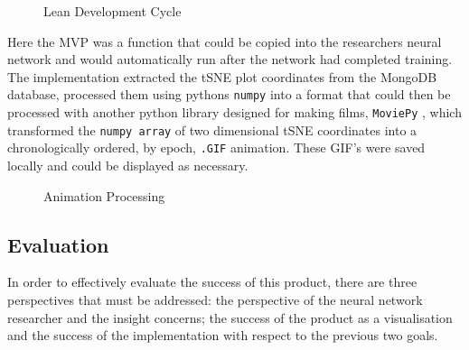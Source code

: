 \documentclass[a4paper,11pt,titlepage]{article}
\begin{document}
	\begin{figure}[H]
    			\caption{Lean Development Cycle}%
	\end{figure}	
	
	Here the MVP was a function that could be copied into the researchers neural network and would automatically run after the network had completed training. The implementation extracted the tSNE plot coordinates from the MongoDB database, processed them using pythons \texttt{numpy} into a format that could then be processed with another python library designed for making films, \texttt{MoviePy} \cite{}, which transformed the \texttt{numpy array} of two dimensional tSNE coordinates into a chronologically ordered, by epoch, \texttt{.GIF} animation. These GIF's were saved locally and could be displayed as necessary.
	
	\begin{figure}[H]
    			\caption{Animation Processing}%
	\end{figure}		

	
	\subsection{Evaluation}
	In order to effectively evaluate the success of this product, there are three perspectives that must be addressed: the perspective of the neural network researcher and the insight concerns; the success of the product as a visualisation and the success of the implementation with respect to the previous two goals.
	
\end{document}
